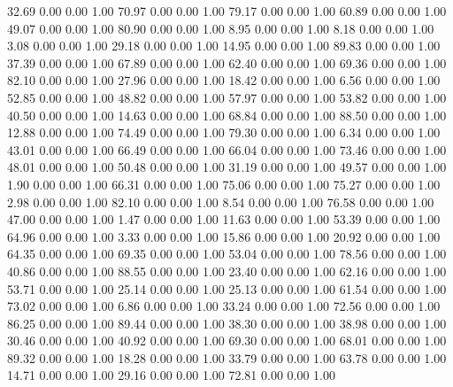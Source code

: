    32.69   0.00   0.00   1.00
   70.97   0.00   0.00   1.00
   79.17   0.00   0.00   1.00
   60.89   0.00   0.00   1.00
   49.07   0.00   0.00   1.00
   80.90   0.00   0.00   1.00
    8.95   0.00   0.00   1.00
    8.18   0.00   0.00   1.00
    3.08   0.00   0.00   1.00
   29.18   0.00   0.00   1.00
   14.95   0.00   0.00   1.00
   89.83   0.00   0.00   1.00
   37.39   0.00   0.00   1.00
   67.89   0.00   0.00   1.00
   62.40   0.00   0.00   1.00
   69.36   0.00   0.00   1.00
   82.10   0.00   0.00   1.00
   27.96   0.00   0.00   1.00
   18.42   0.00   0.00   1.00
    6.56   0.00   0.00   1.00
   52.85   0.00   0.00   1.00
   48.82   0.00   0.00   1.00
   57.97   0.00   0.00   1.00
   53.82   0.00   0.00   1.00
   40.50   0.00   0.00   1.00
   14.63   0.00   0.00   1.00
   68.84   0.00   0.00   1.00
   88.50   0.00   0.00   1.00
   12.88   0.00   0.00   1.00
   74.49   0.00   0.00   1.00
   79.30   0.00   0.00   1.00
    6.34   0.00   0.00   1.00
   43.01   0.00   0.00   1.00
   66.49   0.00   0.00   1.00
   66.04   0.00   0.00   1.00
   73.46   0.00   0.00   1.00
   48.01   0.00   0.00   1.00
   50.48   0.00   0.00   1.00
   31.19   0.00   0.00   1.00
   49.57   0.00   0.00   1.00
    1.90   0.00   0.00   1.00
   66.31   0.00   0.00   1.00
   75.06   0.00   0.00   1.00
   75.27   0.00   0.00   1.00
    2.98   0.00   0.00   1.00
   82.10   0.00   0.00   1.00
    8.54   0.00   0.00   1.00
   76.58   0.00   0.00   1.00
   47.00   0.00   0.00   1.00
    1.47   0.00   0.00   1.00
   11.63   0.00   0.00   1.00
   53.39   0.00   0.00   1.00
   64.96   0.00   0.00   1.00
    3.33   0.00   0.00   1.00
   15.86   0.00   0.00   1.00
   20.92   0.00   0.00   1.00
   64.35   0.00   0.00   1.00
   69.35   0.00   0.00   1.00
   53.04   0.00   0.00   1.00
   78.56   0.00   0.00   1.00
   40.86   0.00   0.00   1.00
   88.55   0.00   0.00   1.00
   23.40   0.00   0.00   1.00
   62.16   0.00   0.00   1.00
   53.71   0.00   0.00   1.00
   25.14   0.00   0.00   1.00
   25.13   0.00   0.00   1.00
   61.54   0.00   0.00   1.00
   73.02   0.00   0.00   1.00
    6.86   0.00   0.00   1.00
   33.24   0.00   0.00   1.00
   72.56   0.00   0.00   1.00
   86.25   0.00   0.00   1.00
   89.44   0.00   0.00   1.00
   38.30   0.00   0.00   1.00
   38.98   0.00   0.00   1.00
   30.46   0.00   0.00   1.00
   40.92   0.00   0.00   1.00
   69.30   0.00   0.00   1.00
   68.01   0.00   0.00   1.00
   89.32   0.00   0.00   1.00
   18.28   0.00   0.00   1.00
   33.79   0.00   0.00   1.00
   63.78   0.00   0.00   1.00
   14.71   0.00   0.00   1.00
   29.16   0.00   0.00   1.00
   72.81   0.00   0.00   1.00
